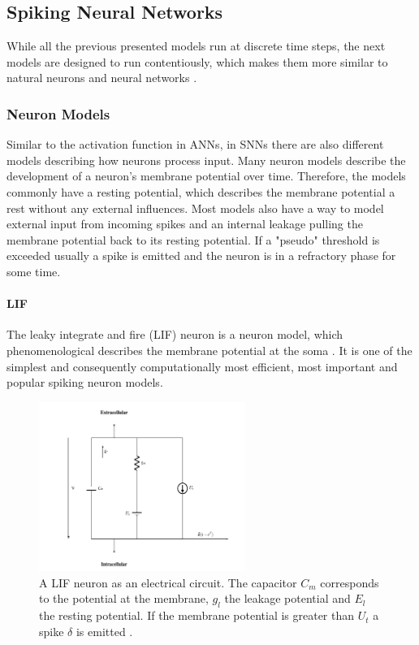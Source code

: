 \subsection{Spiking Neural Networks} \label{c:snns}

While all the previous presented models run at discrete time steps, the next models are designed to run contentiously, which makes them more similar to natural neurons and neural networks \cite{maass1997networks}. 

\subsubsection{Neuron Models} \label{c:snnneurons}

Similar to the activation function in ANNs, in SNNs there are also different models describing how neurons process input.
Many neuron models describe the development of a neuron's membrane potential over time.
Therefore, the models commonly have a resting potential, which describes the membrane potential a rest without any external influences. 
Most models also have a way to model external input from incoming spikes and an internal leakage pulling the membrane potential back to its resting potential. 
If a "pseudo" threshold is exceeded usually a spike is emitted and the neuron is in a refractory phase for some time.

\paragraph{LIF} \label{c:lif}

The leaky integrate and fire (LIF) neuron is a neuron model, which phenomenological describes the membrane potential at the soma \cite{abbott1999lapicque, gerstner2014neuronal, Petrovici2016}. 
It is one of the simplest and consequently computationally most efficient, most important and popular spiking neuron models.  

\begin{figure}
	\centering
    	\includegraphics[width=0.6\textwidth]{imgs/lif.png} 
    \caption[A LIF neuron as an electrical circuit.]{A LIF neuron as an electrical circuit. The capacitor $C_m$ corresponds to the potential at the membrane, $g_l$ the leakage potential and $E_l$ the resting potential. If the membrane potential is greater than $U_t$ a spike $\delta$ is emitted \cite{heikoMA}.}
	\label{fig:lif}
\end{figure}

